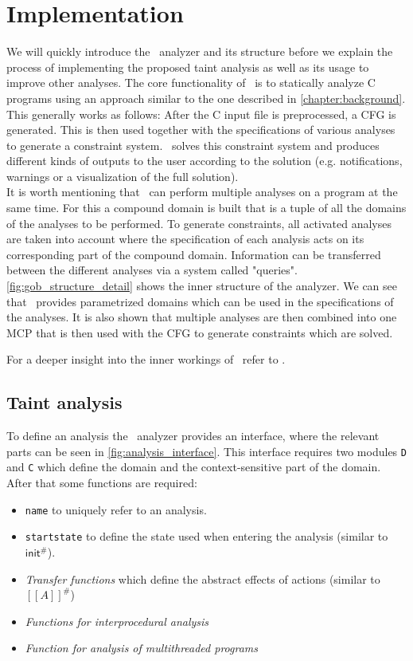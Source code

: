   \section{Implementation}
  We will quickly introduce the \gob\ analyzer and its structure before we explain the process of implementing the proposed taint analysis as well as its usage to improve other analyses. The core functionality of \gob\ is to statically analyze C programs using an approach similar to the one described in \autoref{chapter:background}. This generally works as follows: After the C input file is preprocessed, a \ac{CFG} is generated. This is then used together with the specifications of various analyses to generate a constraint system. \gob\ solves this constraint system and produces different kinds of outputs to the user according to the solution (e.g. notifications, warnings or a visualization of the full solution).\\
  It is worth mentioning that \gob\ can perform multiple analyses on a program at the same time. For this a compound domain is built that is a tuple of all the domains of the analyses to be performed. To generate constraints, all activated analyses are taken into account where the specification of each analysis acts on its corresponding part of the compound domain. Information can be transferred between the different analyses via a system called "queries".\\
  \autoref{fig:gob_structure_detail} shows the inner structure of the analyzer. We can see that \gob\ provides parametrized domains which can be used in the specifications of the analyses. It is also shown that multiple analyses are then combined into one MCP that is then used with the \ac{CFG} to generate constraints which are solved.
  
  For a deeper insight into the inner workings of \gob\ refer to \parencite{apinis2014frameworks}.
  
    \subsection{Taint analysis}
    To define an analysis the \gob\ analyzer provides an interface, where the relevant parts can be seen in \autoref{fig:analysis_interface}. This interface requires two modules \texttt{D} and \texttt{C} which define the domain and the context-sensitive part of the domain. After that some functions are required: 
    \begin{itemize}
      \item \texttt{name} to uniquely refer to an analysis.
      \item \texttt{startstate} to define the state used when entering the analysis (similar to $\textsf{init}^{\#}$).
      \item \textit{Transfer functions} which define the abstract effects of actions (similar to $[\![A]\!]^{\#}$)
      \item \textit{Functions for interprocedural analysis}
      \item \textit{Function for analysis of multithreaded programs}
    \end{itemize}

